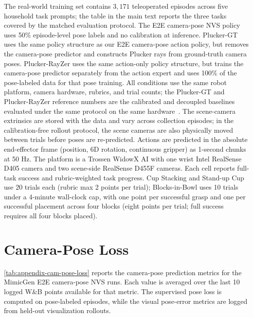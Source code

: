 The real-world training set contains \(3{,}171\) teleoperated episodes across
five household task prompts; the table in the main text reports the three tasks
covered by the matched evaluation protocol.  The E2E camera-pose NVS policy uses
50\% episode-level pose labels and no calibration at inference.  Plucker-GT uses
the same policy structure as our E2E camera-pose action policy, but removes the
camera-pose predictor and constructs Plucker rays from ground-truth camera
poses.  Plucker-RayZer uses the same action-only policy structure, but trains
the camera-pose predictor separately from the action expert and uses 100\% of
the pose-labeled data for that pose training.  All conditions use the same robot
platform, camera hardware, rubrics, and trial counts; the Plucker-GT and
Plucker-RayZer reference numbers are the calibrated and decoupled baselines
evaluated under the same protocol on the same
hardware~\citep{anonymous2026cameraaware}.  The scene-camera extrinsics are
stored with the data and vary across collection episodes; in the
calibration-free rollout protocol, the scene cameras are also physically moved
between trials before poses are re-predicted.  Actions are predicted in the
absolute end-effector frame (position, 6D rotation, continuous gripper) as
1-second chunks at 50 Hz.  The platform is a Trossen WidowX AI with one wrist
Intel RealSense D405 camera and two scene-side RealSense D455F cameras.  Each
cell reports full-task success and rubric-weighted task progress.  Cup Stacking
and Stand-up Cup use 20 trials each (rubric max 2 points per trial);
Blocks-in-Bowl uses 10 trials under a 4-minute wall-clock cap, with one point
per successful grasp and one per successful placement across four blocks (eight
points per trial; full success requires all four blocks placed).

\section{Camera-Pose Loss}

\autoref{tab:appendix-cam-pose-loss} reports the camera-pose prediction
metrics for the MimicGen E2E camera-pose NVS runs.  Each value is averaged over
the last 10 logged W\&B points available for that metric.  The supervised pose
loss is computed on pose-labeled episodes, while the visual pose-error metrics
are logged from held-out visualization rollouts.

